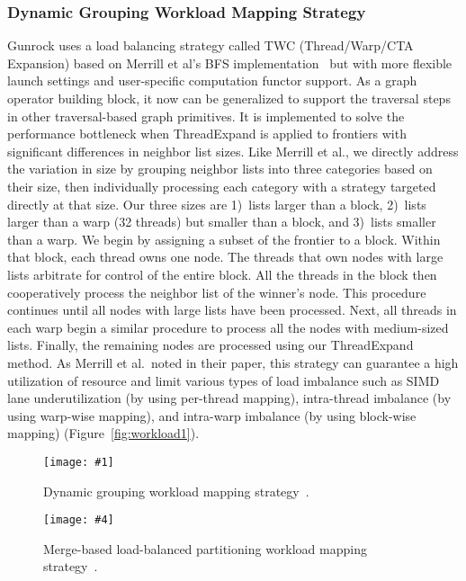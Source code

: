 \documentclass[format=acmsmall,review=false,screen=true]{acmart}
\newcommand\TwoFig[6]{%
  \sbox\IBoxA{\texttt{[image: \#1]}}
  \sbox\IBoxB{\texttt{[image: \#4]}}%
  \ifdim\ht\IBoxA>\ht\IBoxB
    \setlength\IHeight{\ht\IBoxB}\else\setlength\IHeight{\ht\IBoxA}\fi%
  \begin{figure}[!htb]
  \minipage[t]{0.49\textwidth}\centering
  \texttt{[image: \#1]}
  \caption{#2}\label{#3}
  \endminipage\hfill
  \minipage[t]{0.49\textwidth}\centering
  \texttt{[image: \#4]}
  \caption{#5}\label{#6}
  \endminipage
  \end{figure}%
}
\begin{document}
\subsubsection{Dynamic Grouping Workload Mapping Strategy}
\label{sec:opt:twc}
Gunrock uses a load balancing strategy called TWC (Thread/Warp/CTA
Expansion) based on Merrill et al's
BFS implementation~\cite{Merrill:2012:SGG} but with more flexible launch
settings and user-specific computation functor support. As a graph
operator building block, it now can be generalized to support the
traversal steps in other traversal-based graph primitives. It is
implemented to solve the performance bottleneck when ThreadExpand is
applied to frontiers with significant differences in neighbor list
sizes. Like Merrill et al., we directly address the variation in size
by grouping neighbor lists into three categories based on their size,
then individually processing each category with a strategy targeted
directly at that size. Our three sizes are 1)~lists larger than a
block, 2)~lists larger than a warp (32 threads) but smaller than a
block, and 3)~lists smaller than a warp. We begin by assigning a
subset of the frontier to a block. Within that block, each thread owns
one node. The threads that own nodes with large lists arbitrate for
control of the entire block. All the threads in the block then
cooperatively process the neighbor list of the winner's node. This
procedure continues until all nodes with large lists have been
processed. Next, all threads in each warp begin a similar procedure to
process all the nodes with medium-sized lists. Finally, the remaining
nodes are processed using our ThreadExpand method. As Merrill et al.\
noted in their paper, this strategy can guarantee a high utilization
of resource and limit various types of load imbalance such as SIMD
lane underutilization (by using per-thread mapping), intra-thread
imbalance (by using warp-wise mapping), and intra-warp imbalance (by
using block-wise mapping) (Figure~\ref{fig:workload1}).

\TwoFig{lb.pdf}
{Dynamic grouping workload mapping strategy~\cite{Merrill:2012:SGG}.}
{fig:workload1}
{twc.pdf}
{Merge-based load-balanced partitioning workload mapping strategy~\cite{Davidson:2014:WPG}.}
{fig:workload2}
\end{document}
